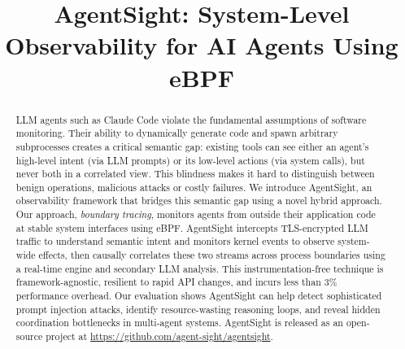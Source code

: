 \documentclass[sigplan,screen,review,9pt]{acmart}
\begin{document}
\title{AgentSight: System-Level Observability for AI Agents Using eBPF}


\author{}


\sloppy
\begin{abstract}
    LLM agents such as Claude Code violate the fundamental assumptions of software monitoring. Their ability to dynamically generate code and spawn arbitrary subprocesses creates a critical semantic gap: existing tools can see either an agent's high-level intent (via LLM prompts) or its low-level actions (via system calls), but never both in a correlated view. This blindness makes it hard to distinguish between benign operations, malicious attacks or costly failures. We introduce AgentSight, an observability framework that bridges this semantic gap using a novel hybrid approach. Our approach, \emph{boundary tracing}, monitors agents from outside their application code at stable system interfaces using eBPF. AgentSight intercepts TLS-encrypted LLM traffic to understand semantic intent and monitors kernel events to observe system-wide effects, then causally correlates these two streams across process boundaries using a real-time engine and secondary LLM analysis. This instrumentation-free technique is framework-agnostic, resilient to rapid API changes, and incurs less than 3\% performance overhead. Our evaluation shows AgentSight can help detect sophisticated prompt injection attacks, identify resource-wasting reasoning loops, and reveal hidden coordination bottlenecks in multi-agent systems. AgentSight is released as an open-source project at \url{https://github.com/agent-sight/agentsight}.
\end{abstract}




\maketitle








\end{document}
